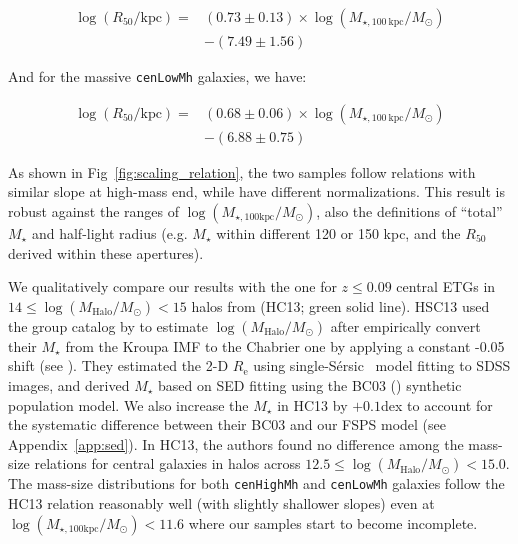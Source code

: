 \documentclass[a4paper,fleqn,usenatbib]{mnras}
\def\ser{{S\'{e}rsic\ }}
\def\rbcg{\texttt{cenHighMh}}
\def\nbcg{\texttt{cenLowMh}}
\def\mstar{{$M_{\star}$}}
\def\logmh{{$\log (M_{\mathrm{Halo}}/M_{\odot})$}}
\def\logmtot{{$\log (M_{\star,100\mathrm{kpc}}/M_{\odot})$}}
\begin{document}
    \begin{equation}
        \begin{aligned}
        \log (R_{\mathrm{50}}/\mathrm{kpc}) = & (0.73\pm0.13) \times \log (M_{\star, 100\ \mathrm{kpc}}/M_{\odot}) \\ & -(7.49\pm1.56)
        \end{aligned}
    \end{equation}

    \noindent And for the massive \nbcg{} galaxies, we have:
    
    \begin{equation}
        \begin{aligned}
        \log (R_{\mathrm{50}}/\mathrm{kpc}) = & (0.68\pm0.06) \times \log (M_{\star, 100\ \mathrm{kpc}}/M_{\odot}) \\ & -(6.88\pm0.75)
        \end{aligned}
    \end{equation}
    
    \noindent As shown in Fig~\ref{fig:scaling_relation}, the two samples follow 
    relations with similar slope at high-mass end, while have different normalizations.
    This result is robust against the ranges of \logmtot{}, also the definitions of 
    ``total'' \mstar{} and  half-light radius (e.g. \mstar{} within different 120 or 150 
    kpc, and the $R_{\mathrm{50}}$ derived within these apertures).
    
    We qualitatively compare our results with the one for $z\leq 0.09$ central ETGs in  
    $14\le$\logmh{}$<15$ halos from \citealt{HCompany13} (HC13; green solid line).
    HSC13 used the group catalog by \citet{Yang2007} to estimate \logmh{} after
    empirically convert their \mstar{} from the Kroupa IMF to the Chabrier one 
    by applying a constant -0.05 shift (see \citealt{Bernardi2016}).
    They estimated the 2-D $R_{\mathrm{e}}$ using single-\ser{} model fitting to SDSS 
    images, and derived \mstar{} based on SED fitting using the BC03 (\citealt{BC03}) 
    synthetic population model.
    We also increase the \mstar{} in HC13 by $+0.1$dex to account for the systematic 
    difference between their BC03 and our FSPS model (see Appendix~\ref{app:sed}). 
    In HC13, the authors found no difference among the mass-size relations for 
    central galaxies in halos across $12.5\le$\logmh{}$<15.0$. 
    The mass-size distributions for both \rbcg{} and \nbcg{} galaxies follow the 
    HC13 relation reasonably well (with slightly shallower slopes) even at 
    \logmtot{}$< 11.6$ where our samples start to become incomplete. 
    
\end{document}
